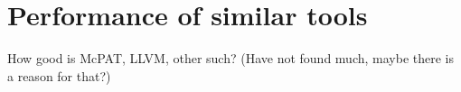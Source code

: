 \section{Performance of similar tools}
How good is McPAT, LLVM, other such? (Have not found much, maybe there is a reason for that?)
